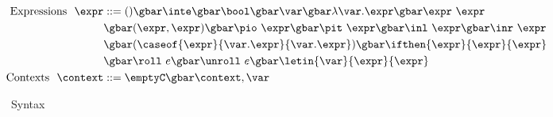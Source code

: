 \begin{figure}
\centering
$\begin{aligned}
\text{Expressions}\ \ 
\expr &::= ()\gbar\inte\gbar\bool\gbar \var
 \gbar \lambda \var. \expr
 \gbar \expr~\expr \\
&\gbar (\expr, \expr) 
 \gbar \pio~\expr 
 \gbar \pit~\expr
 \gbar \inl~\expr 
 \gbar \inr~\expr \\
&\gbar (\caseof {\expr}{\var.\expr}{\var.\expr})
 \gbar \ifthen {\expr}{\expr}{\expr} \\
&\gbar \roll~e
 \gbar \unroll~e
 \gbar \letin{\var}{\expr}{\expr} \\
\text{Contexts}\ \ 
\context &::=\emptyC \gbar \context, \var
\end{aligned} $
\caption{\langmono~Syntax}
\label{fig:monoGrammar}
\end{figure}

